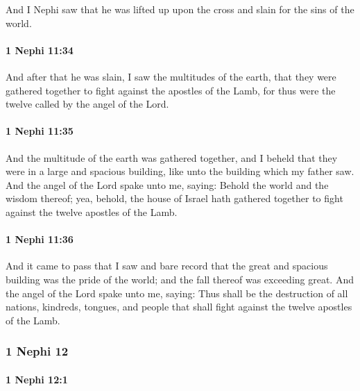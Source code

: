 			And I Nephi saw that he was lifted up upon the cross
			and slain for the sins of the world.

		\paragraph{1 Nephi 11:34} %
			\label{1NEPHI-11-34}

			And after that he was slain, I saw the multitudes of the earth,
			that they were gathered together to fight against the apostles of the Lamb,
			for thus were the twelve called by the angel of the Lord.

		\paragraph{1 Nephi 11:35} %
			\label{1NEPHI-11-35}

			And the multitude of the earth was gathered together,
			and I beheld that they were in a large and spacious building,
			like unto the building which my father saw.
			And the angel of the Lord spake unto me, saying:
			Behold the world and the wisdom thereof;
			yea, behold, the house of Israel hath gathered together
			to fight against the twelve apostles of the Lamb.

		\paragraph{1 Nephi 11:36} %
			\label{1NEPHI-11-36}

			And it came to pass that I saw and bare record
			that the great and spacious building was the pride of the world;
			and the fall thereof was exceeding great.
			And the angel of the Lord spake unto me, saying:
			Thus shall be the destruction of all nations, kindreds, tongues, and people
			that shall fight against the twelve apostles of the Lamb.

	\subsubsection{1 Nephi 12} %
		\label{1NEPHI-12}
		
		\paragraph{1 Nephi 12:1} %
			\label{1NEPHI-12-1}

